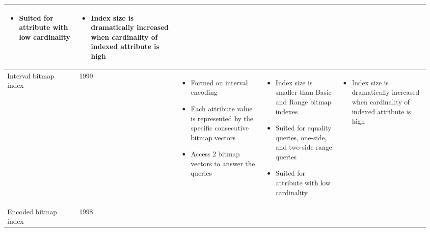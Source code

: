 \documentclass[../main/thesis.tex]{subfiles}
\begin{document}
\begin{landscape}
\begin{longtable}{K{0.12\textwidth}K{0.06\textwidth}K{0.42\textwidth}K{0.42\textwidth}K{0.42\textwidth}}
\begin{minipage}[t]{0.42\textwidth}
\begin{itemize}[label=-, leftmargin=0.5cm, noitemsep]
				\item Suited for attribute with low cardinality
			\end{itemize}
		\end{minipage} &
		\begin{minipage}[t]{0.42\textwidth}
			\begin{itemize}[label=-, leftmargin=0.5cm, noitemsep]
				\item Index size is dramatically increased when cardinality of indexed attribute is high
			\end{itemize}
		\end{minipage} \\
		\hline
		Interval bitmap index \cite{IntervalBI} & 1999 & 
		\begin{minipage}[t]{0.42\textwidth}
			\begin{itemize}[label=-, leftmargin=0.5cm, noitemsep]
				\item Formed on interval encoding
				\item Each attribute value is represented by the specific consecutive bitmap vectors
				\item Access 2 bitmap vectors to answer the queries
			\end{itemize}
		\end{minipage} &
		\begin{minipage}[t]{0.42\textwidth}
			\begin{itemize}[label=-, leftmargin=0.5cm, noitemsep]
				\item Index size is smaller than Basic and Range bitmap indexes
				\item Suited for equality queries, one-side, and two-side range queries
				\item Suited for attribute with low cardinality
			\end{itemize}
		\end{minipage} &
		\begin{minipage}[t]{0.42\textwidth}
			\begin{itemize}[label=-, leftmargin=0.5cm, noitemsep]
				\item Index size is dramatically increased when cardinality of indexed attribute is high
			\end{itemize}
		\end{minipage} \\
		\hline
		Encoded bitmap index \cite{EncodedBI} & 1998 & 
		\begin{minipage}[t]{0.42\textwidth}

\end{minipage}
\end{longtable}
\end{landscape}
\end{document}
